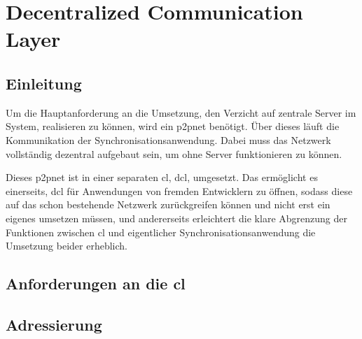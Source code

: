\chapter{Decentralized Communication Layer}
\renewcommand{\kapitelautor}{Autor: Martin Exner}

\section{Einleitung}
Um die Hauptanforderung an die Umsetzung, den Verzicht auf zentrale Server im System, realisieren zu können,
wird ein \gls{p2pnet} benötigt. Über dieses läuft die Kommunikation der Synchronisationsanwendung.
Dabei muss das Netzwerk vollständig dezentral aufgebaut sein, um ohne Server funktionieren zu können.

Dieses \gls{p2pnet} ist in einer separaten \gls{cl}, \gls{dcl}, umgesetzt.
Das ermöglicht es einerseits, \gls{dcl} für Anwendungen von fremden Entwicklern zu öffnen, sodass diese auf das schon bestehende Netzwerk
zurückgreifen können und nicht erst ein eigenes umsetzen müssen, und andererseits erleichtert die klare Abgrenzung der Funktionen
zwischen \gls{cl} und eigentlicher Synchronisationsanwendung die Umsetzung beider erheblich.

\section{Anforderungen an die \gls{cl}}


\section{Adressierung}

